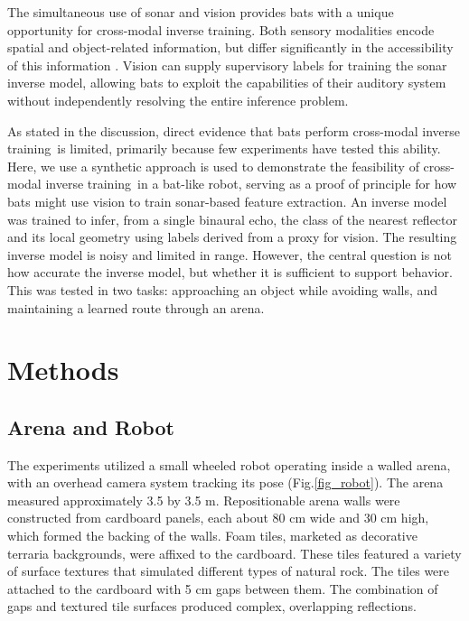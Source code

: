 \documentclass[11pt]{article}
\newcommand{\cmt}{cross-modal inverse training}
\begin{document}
The simultaneous use of sonar and vision provides bats with a unique opportunity for \cmt. Both sensory modalities encode spatial and object-related information, but differ significantly in the accessibility of this information \citep[e.g.,][]{Holland2005,Page2021}. Vision can supply supervisory labels for training the sonar inverse model, allowing bats to exploit the capabilities of their auditory system without independently resolving the entire inference problem.

As stated in the discussion, direct evidence that bats perform \cmt\ is limited, primarily because few experiments have tested this ability. Here, we use a synthetic approach is used to demonstrate the feasibility of \cmt\ in a bat-like robot, serving as a proof of principle for how bats might use vision to train sonar-based feature extraction. An inverse model was trained to infer, from a single binaural echo, the class of the nearest reflector and its local geometry using labels derived from a proxy for vision. The resulting inverse model is noisy and limited in range. However, the central question is not how accurate the inverse model, but whether it is sufficient to support behavior. This was tested in two tasks: approaching an object while avoiding walls, and maintaining a learned route through an arena.



\section{Methods}

\subsection{Arena and Robot}

The experiments utilized a small wheeled robot operating inside a walled arena, with an overhead camera system tracking its pose (Fig.\ref{fig_robot}). The arena measured approximately 3.5 by 3.5 m. Repositionable arena walls were constructed from cardboard panels, each about 80 cm wide and 30 cm high, which formed the backing of the walls. Foam tiles, marketed as decorative terraria backgrounds, were affixed to the cardboard. These tiles featured a variety of surface textures that simulated different types of natural rock. The tiles were attached to the cardboard with 5 cm gaps between them. The combination of gaps and textured tile surfaces produced complex, overlapping reflections.
\end{document}
